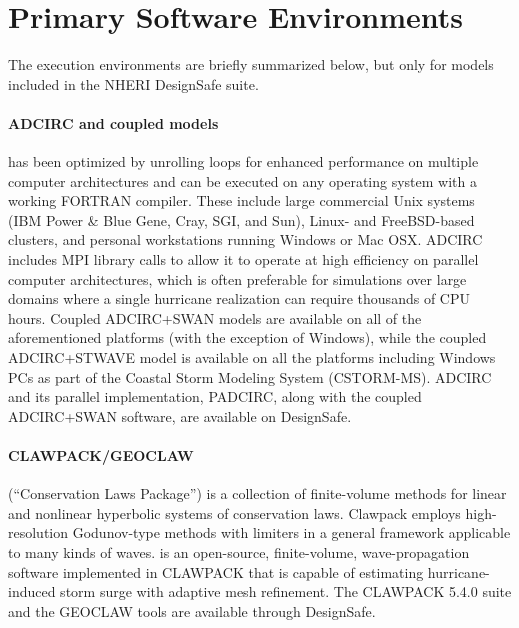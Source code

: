 \section{Primary Software Environments}
\label{sec:storm_surge_tools}

The execution environments are briefly summarized below, but only for models included in the NHERI DesignSafe suite. 

\paragraph{ADCIRC and coupled models}  has been optimized by unrolling loops for enhanced performance on multiple computer architectures and can be executed on any operating system with a working FORTRAN compiler. These include large commercial Unix systems (IBM Power \& Blue Gene, Cray, SGI, and Sun), Linux- and FreeBSD-based clusters, and personal workstations running Windows or Mac OSX. ADCIRC includes MPI library calls to allow it to operate at high efficiency on parallel computer architectures, which is often preferable for simulations over large domains where a single hurricane realization can require thousands of CPU hours. Coupled ADCIRC+SWAN models are available on all of the aforementioned platforms (with the exception of Windows), while the coupled ADCIRC+STWAVE model is available on all the platforms including Windows PCs as part of the Coastal Storm Modeling System (CSTORM-MS). ADCIRC and its parallel implementation, PADCIRC, along with the coupled ADCIRC+SWAN software, are available on DesignSafe.

\paragraph{CLAWPACK/GEOCLAW}  (``Conservation Laws Package'') is a collection of finite-volume methods for linear and nonlinear hyperbolic systems of conservation laws. Clawpack employs high-resolution Godunov-type methods with limiters in a general framework applicable to many kinds of waves.  is an open-source, finite-volume, wave-propagation software implemented in CLAWPACK that is capable of estimating hurricane-induced storm surge with adaptive mesh refinement. The CLAWPACK 5.4.0 suite and the GEOCLAW tools are available through DesignSafe.

